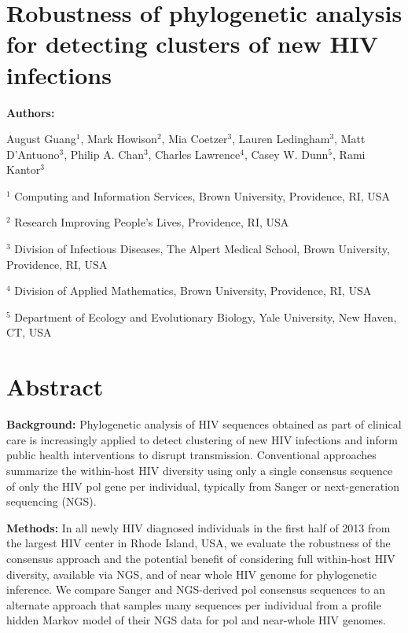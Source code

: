 \documentclass[letterpaper]{article}
\begin{document}
\doublespace

\section*{Robustness of phylogenetic analysis for detecting clusters of new HIV infections}

\textbf{Authors:}

August Guang$^1$, Mark Howison$^2$, Mia Coetzer$^3$, Lauren Ledingham$^3$, Matt D'Antuono$^3$,
Philip A. Chan$^3$, Charles Lawrence$^4$, Casey W. Dunn$^5$, Rami Kantor$^3$

\small $^1$ Computing and Information Services, Brown University, Providence, RI, USA

\small $^2$ Research Improving People's Lives, Providence, RI, USA

\small $^3$ Division of Infectious Diseases, The Alpert Medical School, Brown University, Providence, RI, USA

\small $^4$ Division of Applied Mathematics, Brown University, Providence, RI, USA

\small $^5$ Department of Ecology and Evolutionary Biology, Yale University, New Haven, CT, USA

\linenumbers

\section*{Abstract}

\textbf{Background:} Phylogenetic analysis of HIV sequences obtained as part of clinical care is increasingly applied to detect clustering of new HIV infections and inform public health interventions to disrupt transmission. Conventional approaches summarize the within-host HIV diversity using only a single consensus sequence of only the HIV pol gene per individual, typically from Sanger or next-generation sequencing (NGS).

\textbf{Methods:} In all newly HIV diagnosed individuals in the first half of 2013 from the largest HIV center in Rhode Island, USA, we evaluate the robustness of the consensus approach and the potential benefit of considering full within-host HIV diversity, available via NGS, and of near whole HIV genome for phylogenetic inference. We compare Sanger and NGS-derived pol consensus sequences to an alternate approach that samples many sequences per individual from a profile hidden Markov model of their NGS data for pol and near-whole HIV genomes.
\end{document}
